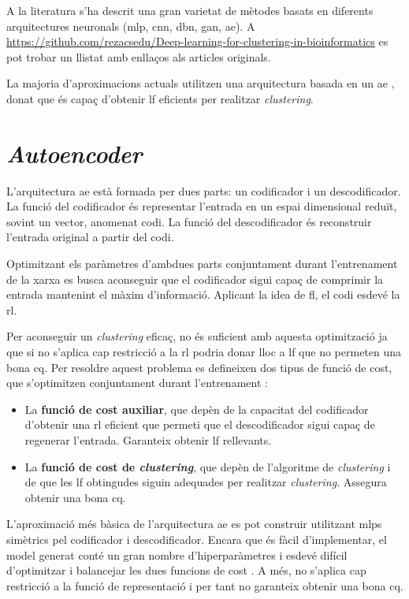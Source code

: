 \documentclass[CAT,BIB]{TFUOC}%
\begin{document}
        A la literatura s'ha descrit una gran varietat de mètodes basats en diferents arquitectures neuronals (\gls{mlp}, \gls{cnn}, \gls{dbn}, \gls{gan}, \gls{ae}). A \url{https://github.com/rezacsedu/Deep-learning-for-clustering-in-bioinformatics} \citep{Karim2021} es pot trobar un llistat amb enllaços als articles originals.

        La majoria d'aproximacions actuals utilitzen una arquitectura basada en un \gls{ae} \citep{Karim2021}, donat que és capaç d'obtenir \gls{lf} eficients per realitzar \textit{clustering}.


    \section{\textit{Autoencoder}}
    \label{s:state_ae}

        L'arquitectura \gls{ae} està formada per dues parts: un codificador i un descodificador. La funció del codificador és representar l'entrada en un espai dimensional reduït, sovint un vector, anomenat codi. La funció del descodificador és reconstruir l'entrada original a partir del codi.

        Optimitzant els paràmetres d'ambdues parts conjuntament durant l'entrenament de la xarxa es busca aconseguir que el codificador sigui capaç de comprimir la entrada mantenint el màxim d'informació. Aplicant la idea de \gls{fl}, el codi esdevé la \gls{rl}.

        Per aconseguir un \textit{clustering} eficaç, no és suficient amb aquesta optimització ja que si no s'aplica cap restricció a la \gls{rl} podria donar lloc a \gls{lf} que no permeten una bona \gls{cq}. Per resoldre aquest problema es defineixen dos tipus de funció de cost, que s'optimitzen conjuntament durant l'entrenament \citep{Min2018}:
        \begin{itemize}
            \item La \textbf{funció de cost auxiliar}, que depèn de la capacitat del codificador d'obtenir una \gls{rl} eficient que permeti que el descodificador sigui capaç de regenerar l'entrada. Garanteix obtenir \gls{lf} rellevants.
            \item La \textbf{funció de cost de \textit{clustering}}, que depèn de l'algoritme de \textit{clustering} i de que les \gls{lf} obtingudes siguin adequades per realitzar \textit{clustering}. Assegura obtenir una bona \gls{cq}.
        \end{itemize}

        L'aproximació més bàsica de l'arquitectura \gls{ae} es pot construir utilitzant \glspl{mlp} simètrics pel codificador i descodificador. Encara que és fàcil d'implementar, el model generat conté un gran nombre d'hiperparàmetres i esdevé difícil d'optimitzar i balancejar les dues funcions de cost \citep{Karim2021}. A més, no s'aplica cap restricció a la funció de representació i per tant no garanteix obtenir una bona \gls{cq}.
\end{document}
